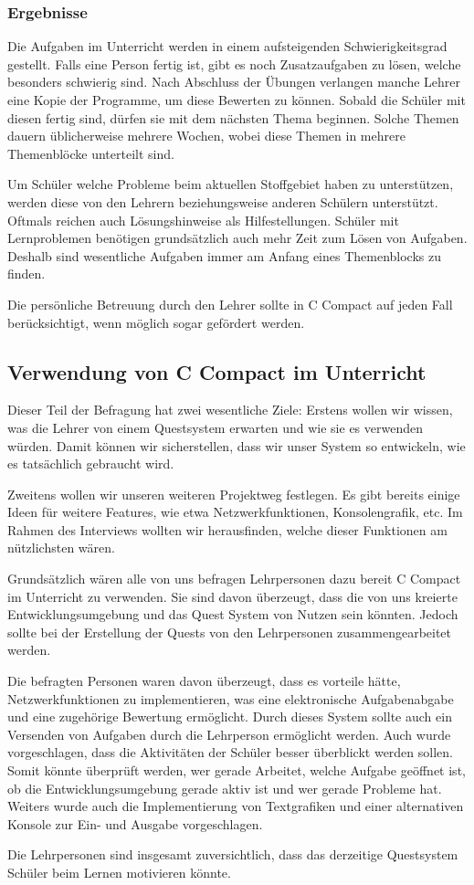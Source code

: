 \subsubsection*{Ergebnisse}

Die Aufgaben im Unterricht werden in einem aufsteigenden Schwierigkeitsgrad gestellt. Falls eine Person fertig ist, gibt es noch Zusatzaufgaben zu lösen, welche besonders schwierig sind. Nach Abschluss der Übungen verlangen manche Lehrer eine Kopie der Programme, um diese Bewerten zu können. Sobald die Schüler mit diesen fertig sind, dürfen sie mit dem nächsten Thema beginnen.
Solche Themen dauern üblicherweise mehrere Wochen, wobei diese Themen in mehrere Themenblöcke unterteilt sind.

Um Schüler welche Probleme beim aktuellen Stoffgebiet haben zu unterstützen, werden diese von den Lehrern beziehungsweise anderen Schülern unterstützt. Oftmals reichen auch Lösungshinweise als Hilfestellungen. Schüler mit Lernproblemen benötigen grundsätzlich auch mehr Zeit zum Lösen von Aufgaben. Deshalb sind wesentliche Aufgaben immer am Anfang eines Themenblocks zu finden.

Die persönliche Betreuung durch den Lehrer sollte in C Compact auf jeden Fall berücksichtigt, wenn möglich sogar gefördert werden.

\subsection{Verwendung von C Compact im Unterricht}
Dieser Teil der Befragung hat zwei wesentliche Ziele: Erstens wollen wir wissen, was die Lehrer von einem Questsystem erwarten und wie sie es verwenden würden. Damit können wir sicherstellen, dass wir unser System so entwickeln, wie es tatsächlich gebraucht wird.

Zweitens wollen wir unseren weiteren Projektweg festlegen. Es gibt bereits einige Ideen für weitere Features, wie etwa Netzwerkfunktionen, Konsolengrafik, etc. Im Rahmen des Interviews wollten wir herausfinden, welche dieser Funktionen am nützlichsten wären.

Grundsätzlich wären alle von uns befragen Lehrpersonen dazu bereit C Compact im Unterricht zu verwenden. Sie sind davon überzeugt, dass die von uns kreierte Entwicklungsumgebung und das Quest System von Nutzen sein könnten. Jedoch sollte bei der Erstellung der Quests von den Lehrpersonen zusammengearbeitet werden.

Die befragten Personen waren davon überzeugt, dass es vorteile hätte, Netzwerkfunktionen zu implementieren, was eine elektronische Aufgabenabgabe und eine zugehörige Bewertung ermöglicht. Durch dieses System sollte auch ein Versenden von Aufgaben durch die Lehrperson ermöglicht werden. Auch wurde vorgeschlagen, dass die Aktivitäten der Schüler besser überblickt werden sollen. Somit könnte überprüft werden, wer gerade Arbeitet, welche Aufgabe geöffnet ist, ob die Entwicklungsumgebung gerade aktiv ist und wer gerade Probleme hat. Weiters wurde auch die Implementierung von Textgrafiken und einer alternativen Konsole zur Ein- und Ausgabe vorgeschlagen.

Die Lehrpersonen sind insgesamt zuversichtlich, dass das derzeitige Questsystem Schüler beim Lernen motivieren könnte.
